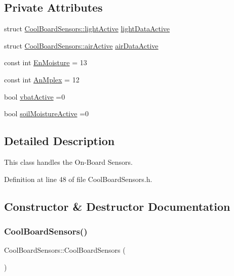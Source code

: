 \subsection*{Private Attributes}
\begin{DoxyCompactItemize}
\item 
struct \hyperlink{struct_cool_board_sensors_1_1light_active}{Cool\+Board\+Sensors\+::light\+Active} \hyperlink{class_cool_board_sensors_ac4deb1cf41bac8b91c780c92fab00ba4}{light\+Data\+Active}
\item 
struct \hyperlink{struct_cool_board_sensors_1_1air_active}{Cool\+Board\+Sensors\+::air\+Active} \hyperlink{class_cool_board_sensors_abff8dfeccb2f7689847bb64d5f1cd31e}{air\+Data\+Active}
\item 
const int \hyperlink{class_cool_board_sensors_a6177d02e14a057a2f171a2e930b5038d}{En\+Moisture} = 13
\item 
const int \hyperlink{class_cool_board_sensors_a12ef28b1046219e0aee10bf64e28c4a5}{An\+Mplex} = 12
\item 
bool \hyperlink{class_cool_board_sensors_ab0b4bbae83796b52b90f91008d383583}{vbat\+Active} =0
\item 
bool \hyperlink{class_cool_board_sensors_ae7971bf527781ac4994309591b78ab89}{soil\+Moisture\+Active} =0
\end{DoxyCompactItemize}


\subsection{Detailed Description}
This class handles the On-\/\+Board Sensors. 

Definition at line 48 of file Cool\+Board\+Sensors.\+h.



\subsection{Constructor \& Destructor Documentation}
\mbox{\label{class_cool_board_sensors_a91ff2a02f5486f90cf2413a1cf8a9ed4}} 
\subsubsection{\texorpdfstring{Cool\+Board\+Sensors()}{CoolBoardSensors()}}
{\footnotesize\ttfamily Cool\+Board\+Sensors\+::\+Cool\+Board\+Sensors (\begin{DoxyParamCaption}{ }\end{DoxyParamCaption})}

